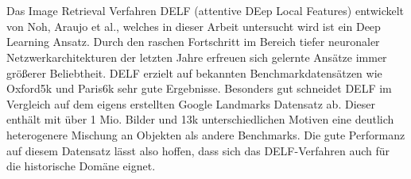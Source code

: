 \\\\
Das Image Retrieval Verfahren DELF (attentive DEep Local Features) \cite{delf} entwickelt von Noh, Araujo et al., welches in dieser Arbeit untersucht wird ist ein Deep Learning Ansatz. Durch den raschen Fortschritt im Bereich tiefer neuronaler Netzwerkarchitekturen der letzten Jahre erfreuen sich gelernte Ansätze immer größerer Beliebtheit. DELF erzielt auf bekannten Benchmarkdatensätzen wie Oxford5k \cite{oxford5k} und Paris6k \cite{paris6k} sehr gute Ergebnisse. Besonders gut schneidet DELF im Vergleich auf dem eigens erstellten Google Landmarks Datensatz \cite{landmarks} ab. Dieser enthält mit über 1 Mio. Bilder und 13k unterschiedlichen Motiven eine deutlich heterogenere Mischung an Objekten als andere Benchmarks. Die gute Performanz auf diesem Datensatz lässt also hoffen, dass sich das DELF-Verfahren auch für die historische Domäne eignet.



